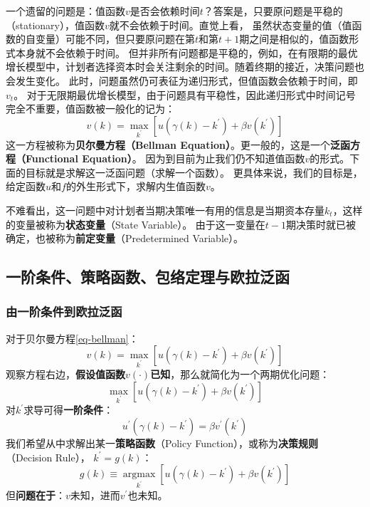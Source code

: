 一个遗留的问题是：值函数$v$是否会依赖时间$t$？答案是，只要原问题是平稳的（stationary），值函数$v$就不会依赖于时间。直觉上看，
虽然状态变量的值（值函数的自变量）可能不同，但只要原问题在第$t$和第$t+1$期之间是相似的，值函数形式本身就不会依赖于时间。
但并非所有问题都是平稳的，例如，在有限期的最优增长模型中，计划者选择资本时会关注剩余的时间。随着终期的接近，决策问题也会发生变化。
此时，问题虽然仍可表征为递归形式，但值函数会依赖于时间，即$v_t$。
对于无限期最优增长模型，由于问题具有平稳性，因此递归形式中时间记号完全不重要，值函数被一般化的记为：
\begin{equation}    \label{eq-bellman}
    v\left(k\right)=\max _{k^{\prime}}\left[u\left(\gamma\left(k\right)-k^{\prime}\right)+\beta v\left(k^{\prime}\right)\right]
\end{equation}
这一方程被称为\textbf{贝尔曼方程（Bellman Equation）}。更一般的，这是一个\textbf{泛函方程（Functional Equation）}。
因为到目前为止我们仍不知道值函数$v$的形式。下面的目标就是求解这一泛函问题（求解一个函数）。
更具体来说，我们的目标是，给定函数$u$和$f$的外生形式下，求解内生值函数$v$。

不难看出，这一问题中对计划者当期决策唯一有用的信息是当期资本存量$k_t$，这样的变量被称为\textbf{状态变量}（State Variable）。
由于这一变量在$t-1$期决策时就已被确定，也被称为\textbf{前定变量}（Predetermined Variable）。


\subsection{一阶条件、策略函数、包络定理与欧拉泛函} \label{subsec-func-euler}


\subsubsection{由一阶条件到欧拉泛函}

对于贝尔曼方程\eqref{eq-bellman}：
$$
v\left(k\right)=\max _{k^{\prime}}\left[u\left(\gamma\left(k\right)-k^{\prime}\right)+\beta v\left(k^{\prime}\right)\right]
$$
观察方程右边，\textbf{假设值函数$v\left(\cdot\right)$已知}，那么就简化为一个两期优化问题：
$$
\max _{k^{\prime}}\left[u\left(\gamma\left(k\right)-k^{\prime}\right)+\beta v\left(k^{\prime}\right)\right]
$$
对$k^{\prime}$求导可得\textbf{一阶条件}：
\begin{equation}    \label{bellman-foc}
    u^{\prime}\left(\gamma\left(k\right)-k^{\prime}\right) = \beta v^{\prime}\left(k^{\prime}\right)
\end{equation}
我们希望从中求解出某一\textbf{策略函数}（Policy Function），或称为\textbf{决策规则}（Decision Rule），
$k^{\prime}=g\left(k\right)$：
\begin{equation*}
    g\left(k\right) \equiv \underset{k^{\prime}}{\operatorname{argmax}}
        [u(\gamma\left(k\right)-k^{\prime})+\beta v\left(k^{\prime}\right)]
\end{equation*}
但\textbf{问题在于}：$v$未知，进而$v^{\prime}$也未知。

